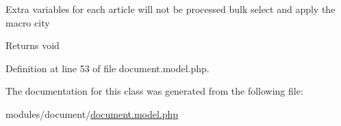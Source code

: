 Extra variables for each article will not be processed bulk select and apply the macro city \begin{DoxyReturn}{Returns}
void 
\end{DoxyReturn}


Definition at line 53 of file document.\+model.\+php.



The documentation for this class was generated from the following file\+:\begin{DoxyCompactItemize}
\item 
modules/document/\hyperlink{document_8model_8php}{document.\+model.\+php}\end{DoxyCompactItemize}
